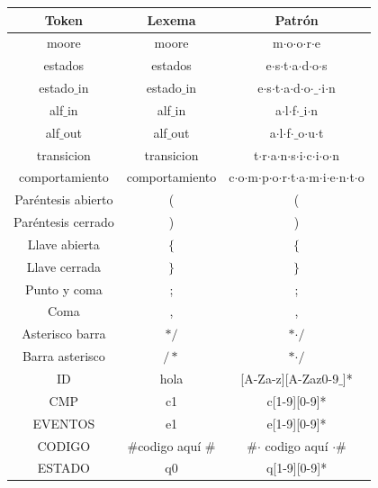 \documentclass[12pt,a4paper]{article}
\begin{document}
{	\begin{center}
		\begin{tabular}{|c|c|c|}
			\hline 
			\textbf{Token} & \textbf{Lexema} & \textbf{Patrón} \\ 
			\hline 
			moore & moore & m$\cdot$o$\cdot$o$\cdot$r$\cdot$e  \\ 
			\hline 
			estados &estados & e$\cdot$s$\cdot$t$\cdot$a$\cdot$d$\cdot$o$\cdot$s \\ 
			\hline 
			estado$\_$in & estado$\_$in & e$\cdot$s$\cdot$t$\cdot$a$\cdot$d$\cdot$o$\cdot$$\_$$\cdot$i$\cdot$n \\ 
			\hline 
			alf$\_$in	& alf$\_$in & a$\cdot$l$\cdot$f$\cdot$$\_$i$\cdot$n \\ 
			\hline 
				alf$\_$out	& alf$\_$out & a$\cdot$l$\cdot$f$\cdot$$\_$o$\cdot$u$\cdot$t \\ 
			\hline 
				transicion	& transicion & t$\cdot$r$\cdot$a$\cdot$n$\cdot$s$\cdot$i$\cdot$c$\cdot$i$\cdot$o$\cdot$n \\ 
			\hline 
				comportamiento	& comportamiento & c$\cdot$o$\cdot$m$\cdot$p$\cdot$o$\cdot$r$\cdot$t$\cdot$a$\cdot$m$\cdot$i$\cdot$e$\cdot$n$\cdot$t$\cdot$o \\ 
			\hline 
			Paréntesis abierto	& ( & ( \\ 
			\hline 
			Paréntesis cerrado	& ) & ) \\ 
			\hline 
			Llave abierta	& $\{$ & $\{$ \\ 
			\hline 
			Llave cerrada	& $\}$ & $\}$ \\ 
			\hline 
			Punto y coma	& ; & ; \\ 
			\hline 
			Coma	& , &  , \\ 
			\hline
			Asterisco barra & $\ast/$  & $\ast$$\cdot/$ \\ 
			\hline 
			Barra asterisco & $/\ast$  &  $\ast$$\cdot/$ \\ 
			\hline  
			ID	& hola  & [A-Za-z][A-Zaz0-9$\_$]* \\ 
			\hline 
			CMP	& c1 & c[1-9][0-9]* \\ 
			\hline
			EVENTOS	& e1  & e[1-9][0-9]* \\ 
			\hline
		    CODIGO	& $\#$codigo aquí $\#$  & $\#$$\cdot$ codigo aquí $\cdot$$\#$\\ 
			\hline
			ESTADO	& q0  & q[1-9][0-9]*\\ 
			\hline
		\end{tabular} 	
	\end{center}
	\newpage
}
\end{document}
